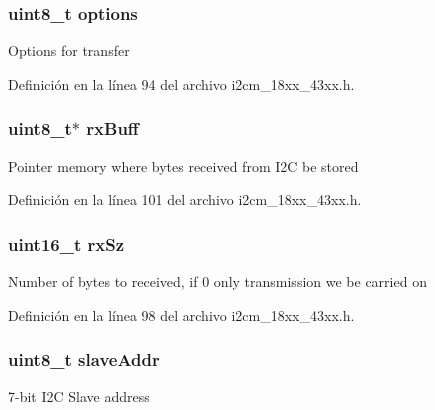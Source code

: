 \subsubsection[{\texorpdfstring{options}{options}}]{\setlength{\rightskip}{0pt plus 5cm}uint8\+\_\+t options}\hypertarget{struct_i2_c_m___x_f_e_r___t_aace3d640c8d449b8db1162993d259d3f}{}\label{struct_i2_c_m___x_f_e_r___t_aace3d640c8d449b8db1162993d259d3f}
Options for transfer 

Definición en la línea 94 del archivo i2cm\+\_\+18xx\+\_\+43xx.\+h.

\subsubsection[{\texorpdfstring{rx\+Buff}{rxBuff}}]{\setlength{\rightskip}{0pt plus 5cm}uint8\+\_\+t$\ast$ rx\+Buff}\hypertarget{struct_i2_c_m___x_f_e_r___t_a0aa410ff8cbc01a00b2fa2189e1c2938}{}\label{struct_i2_c_m___x_f_e_r___t_a0aa410ff8cbc01a00b2fa2189e1c2938}
Pointer memory where bytes received from I2C be stored 

Definición en la línea 101 del archivo i2cm\+\_\+18xx\+\_\+43xx.\+h.

\subsubsection[{\texorpdfstring{rx\+Sz}{rxSz}}]{\setlength{\rightskip}{0pt plus 5cm}uint16\+\_\+t rx\+Sz}\hypertarget{struct_i2_c_m___x_f_e_r___t_a05f4dc274b335e29f87dbc8575a170b9}{}\label{struct_i2_c_m___x_f_e_r___t_a05f4dc274b335e29f87dbc8575a170b9}
Number of bytes to received, if 0 only transmission we be carried on 

Definición en la línea 98 del archivo i2cm\+\_\+18xx\+\_\+43xx.\+h.

\subsubsection[{\texorpdfstring{slave\+Addr}{slaveAddr}}]{\setlength{\rightskip}{0pt plus 5cm}uint8\+\_\+t slave\+Addr}\hypertarget{struct_i2_c_m___x_f_e_r___t_a771bfcb0b066269afae6905ce5804c89}{}\label{struct_i2_c_m___x_f_e_r___t_a771bfcb0b066269afae6905ce5804c89}
7-\/bit I2C Slave address 

